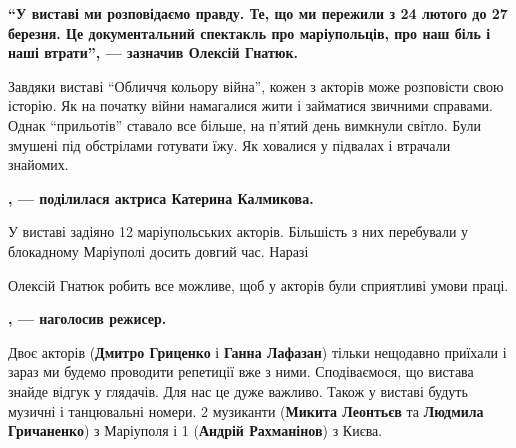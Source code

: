 \begin{leftbar}
	\begingroup
		\bfseries
\enquote{У виставі ми розповідаємо правду. Те, що ми пережили з 24 лютого до 27
березня. Це документальний спектакль про маріупольців, про наш біль і
наші втрати}, — зазначив Олексій Гнатюк.
	\endgroup
\end{leftbar}


Завдяки виставі \enquote{Обличчя кольору війна}, кожен з акторів може розповісти свою
історію. Як на початку війни намагалися жити і займатися звичними справами.
Однак \enquote{прильотів} ставало все більше, на п'ятий день вимкнули світло. Були
змушені під обстрілами готувати їжу. Як ховалися у підвалах і втрачали
знайомих.

\begin{leftbar}
	\begingroup
		\bfseries
{}, — поділилася актриса Катерина Калмикова.
	\endgroup
\end{leftbar}


У виставі задіяно 12 маріупольських акторів. Більшість з них перебували у
блокадному Маріуполі досить довгий час. Наразі\par\noindent Олексій Гнатюк робить все
можливе, щоб у акторів були сприятливі умови праці.

\begin{leftbar}
	\begingroup
		\bfseries
{}, — наголосив режисер. 
	\endgroup
\end{leftbar}

Двоє акторів (\textbf{Дмитро Гриценко} і \textbf{Ганна Лафазан}) тільки нещодавно приїхали і
зараз ми будемо проводити репетиції вже з ними. Сподіваємося, що вистава знайде
відгук у глядачів. Для нас це дуже важливо. Також у виставі будуть музичні і
танцювальні номери. 2 музиканти (\textbf{Микита Леонтьєв} та \textbf{Людмила Гричаненко}) з
Маріуполя і 1 (\textbf{Андрій Рахманінов}) з Києва.

